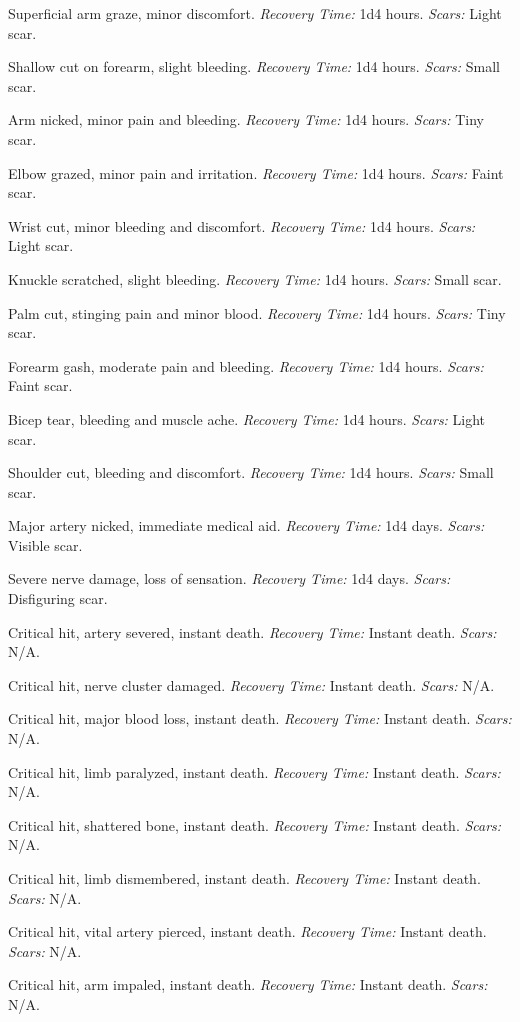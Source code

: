 \documentclass[12pt]{book}
\begin{document}
\begin{description}[labelwidth=1.5em, leftmargin=*, itemsep=0.4em]
    \item[1 -] Superficial arm graze, minor discomfort. \textit{Recovery Time:} 1d4 hours. \textit{Scars:} Light scar.
    \item[2 -] Shallow cut on forearm, slight bleeding. \textit{Recovery Time:} 1d4 hours. \textit{Scars:} Small scar.
    \item[3 -] Arm nicked, minor pain and bleeding. \textit{Recovery Time:} 1d4 hours. \textit{Scars:} Tiny scar.
    \item[4 -] Elbow grazed, minor pain and irritation. \textit{Recovery Time:} 1d4 hours. \textit{Scars:} Faint scar.
    \item[5 -] Wrist cut, minor bleeding and discomfort. \textit{Recovery Time:} 1d4 hours. \textit{Scars:} Light scar.
    \item[6 -] Knuckle scratched, slight bleeding. \textit{Recovery Time:} 1d4 hours. \textit{Scars:} Small scar.
    \item[7 -] Palm cut, stinging pain and minor blood. \textit{Recovery Time:} 1d4 hours. \textit{Scars:} Tiny scar.
    \item[8 -] Forearm gash, moderate pain and bleeding. \textit{Recovery Time:} 1d4 hours. \textit{Scars:} Faint scar.
    \item[9 -] Bicep tear, bleeding and muscle ache. \textit{Recovery Time:} 1d4 hours. \textit{Scars:} Light scar.
    \item[10 -] Shoulder cut, bleeding and discomfort. \textit{Recovery Time:} 1d4 hours. \textit{Scars:} Small scar.
    \item[11 -] Major artery nicked, immediate medical aid. \textit{Recovery Time:} 1d4 days. \textit{Scars:} Visible scar.
    \item[12 -] Severe nerve damage, loss of sensation. \textit{Recovery Time:} 1d4 days. \textit{Scars:} Disfiguring scar.
    \item[13 -] Critical hit, artery severed, instant death. \textit{Recovery Time:} Instant death. \textit{Scars:} N/A.
    \item[14 -] Critical hit, nerve cluster damaged. \textit{Recovery Time:} Instant death. \textit{Scars:} N/A.
    \item[15 -] Critical hit, major blood loss, instant death. \textit{Recovery Time:} Instant death. \textit{Scars:} N/A.
    \item[16 -] Critical hit, limb paralyzed, instant death. \textit{Recovery Time:} Instant death. \textit{Scars:} N/A.
    \item[17 -] Critical hit, shattered bone, instant death. \textit{Recovery Time:} Instant death. \textit{Scars:} N/A.
    \item[18 -] Critical hit, limb dismembered, instant death. \textit{Recovery Time:} Instant death. \textit{Scars:} N/A.
    \item[19 -] Critical hit, vital artery pierced, instant death. \textit{Recovery Time:} Instant death. \textit{Scars:} N/A.
    \item[20 -] Critical hit, arm impaled, instant death. \textit{Recovery Time:} Instant death. \textit{Scars:} N/A.
\end{description}
\end{document}

